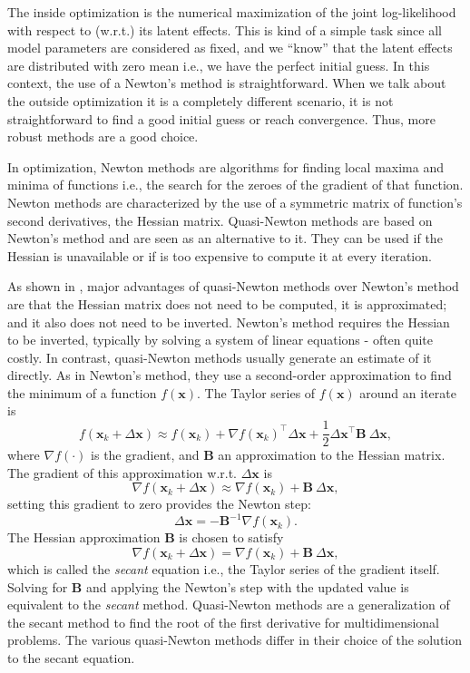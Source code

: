 The inside optimization is the numerical maximization of the joint
log-likelihood with respect to (w.r.t.) its latent effects. This is kind
of a simple task since all model parameters are considered as fixed, and
we ``know'' that the latent effects are distributed with zero mean i.e.,
we have the perfect initial guess. In this context, the use of a
Newton's method is straightforward. When we talk about the outside
optimization it is a completely different scenario, it is not
straightforward to find a good initial guess or reach convergence. Thus,
more robust methods are a good choice.

In optimization, Newton methods are algorithms for finding local maxima
and minima of functions i.e., the search for the zeroes of the gradient
of that function. Newton methods are characterized by the use of a
symmetric matrix of function's second derivatives, the Hessian matrix.
Quasi-Newton methods are based on Newton's method and are seen as an
alternative to it. They can be used if the Hessian is unavailable or if
is too expensive to compute it at every iteration.

As shown in , major advantages of
quasi-Newton methods over Newton's method are that the Hessian matrix
does not need to be computed, it is approximated; and it also does not
need to be inverted. Newton's method requires the Hessian to be
inverted, typically by solving a system of linear equations - often
quite costly. In contrast, quasi-Newton methods usually generate an
estimate of it directly. As in Newton's method, they use a second-order
approximation to find the minimum of a function \(f(\bm{x})\). The
Taylor series of \(f(\bm{x})\) around an iterate is
\[
 f(\bm{x}_{k} + \Delta\bm{x})\approx
 f(\bm{x}_{k}) + \nabla f(\bm{x}_{k})^{\top}\Delta\bm{x} +
 \frac{1}{2} \Delta\bm{x}^{\top}\bm{B}~\Delta\bm{x},
\]
where \(\nabla f(\cdot)\) is the gradient, and \(\bm{B}\) an
approximation to the Hessian matrix. The gradient of this approximation
w.r.t. \(\Delta\bm{x}\) is
\[
 \nabla f(\bm{x}_{k} + \Delta\bm{x}) \approx
 \nabla f(\bm{x}_{k}) + \bm{B}~\Delta\bm{x},
\]
setting this gradient to zero provides the Newton step:
\[
 \Delta\bm{x} = - \bm{B}^{-1}\nabla f(\bm{x}_{k}).
\]
The Hessian approximation \(\bm{B}\) is chosen to satisfy
\[
 \nabla f(\bm{x}_{k} + \Delta\bm{x}) =
 \nabla f(\bm{x}_{k}) + \bm{B}~\Delta\bm{x},
\]
which is called the \textit{secant} equation i.e., the Taylor series of
the gradient itself. Solving for \(\bm{B}\) and applying the Newton's
step with the updated value is equivalent to the \textit{secant} method.
Quasi-Newton methods are a generalization of the secant method to find
the root of the first derivative for multidimensional problems. The
various quasi-Newton methods differ in their choice of the solution to
the secant equation.

